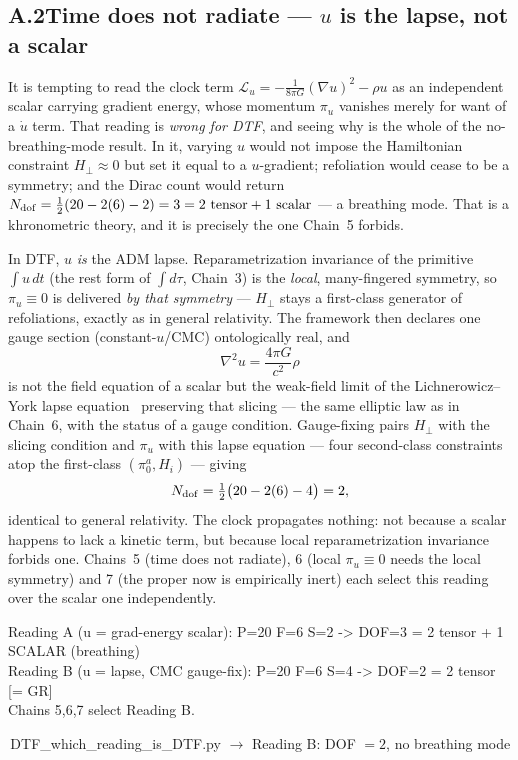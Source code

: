 \documentclass[11pt]{article}
\newcommand{\pychip}[2]{{\footnotesize\colorbox{cbPyBg}{\ttfamily\,#1\,}\,{\color{gray}$\to$ #2}}}
\begin{document}
\subsection*{A.2\quad Time does not radiate --- $u$ is the lapse, not a scalar}
It is tempting to read the clock term $\mathcal L_u=-\tfrac1{8\pi G}(\nabla u)^2-\rho u$ as an independent
scalar carrying gradient energy, whose momentum $\pi_u$ vanishes merely for want of a $\dot u$ term. That
reading is \emph{wrong for DTF}, and seeing why is the whole of the no-breathing-mode result. In it,
varying $u$ would not impose the Hamiltonian constraint $H_\perp\approx0$ but set it equal to a
$u$-gradient; refoliation would cease to be a symmetry; and the Dirac count would return
$N_{\rm dof}=\tfrac12(20-2(6)-2)=3=2\text{ tensor}+1\text{ scalar}$ --- a breathing mode. That is a
khronometric theory, and it is precisely the one Chain~5 forbids.

In DTF, $u$ \emph{is} the ADM lapse. Reparametrization invariance of the primitive $\int u\,dt$ (the rest form of $\int d\tau$, Chain~3) is the
\emph{local}, many-fingered symmetry, so $\pi_u\equiv0$ is delivered \emph{by that symmetry} --- $H_\perp$
stays a first-class generator of refoliations, exactly as in general relativity. The framework then declares
one gauge section (constant-$u$/CMC) ontologically real, and
\[ \nabla^2u=\frac{4\pi G}{c^2}\rho \]
is not the field equation of a scalar but the weak-field limit of the Lichnerowicz--York lapse
equation~\cite{Lichnerowicz1944,York1972} preserving that slicing --- the same
elliptic law as in Chain~6, with the status of a gauge condition. Gauge-fixing pairs $H_\perp$ with the
slicing condition and $\pi_u$ with this lapse equation --- four second-class constraints atop the
first-class $(\pi^a_0,H_i)$ --- giving
\[ N_{\rm dof}=\tfrac12\big(20-2(6)-4\big)=2, \]
identical to general relativity. The clock propagates nothing: not because a scalar happens to lack a
kinetic term, but because local reparametrization invariance forbids one. Chains~5 (time does not radiate),
6 (local $\pi_u\equiv0$ needs the local symmetry) and 7 (the proper now is empirically inert) each select
this reading over the scalar one independently.
\begin{tcolorbox}[colback=cbPyBg,colframe=cbNodeFr,boxrule=0.5pt,arc=2pt,left=8pt,right=8pt,top=4pt,bottom=4pt]
\ttfamily\small Reading A (u = grad-energy scalar): P=20 F=6 S=2 -> DOF=3 = 2 tensor + 1 SCALAR (breathing)\\
Reading B (u = lapse, CMC gauge-fix): P=20 F=6 S=4 -> DOF=2 = 2 tensor  [= GR]\\
Chains 5,6,7 select Reading B.
\end{tcolorbox}
\pychip{DTF\_which\_reading\_is\_DTF.py}{Reading B: DOF $=2$, no breathing mode}
\end{document}
